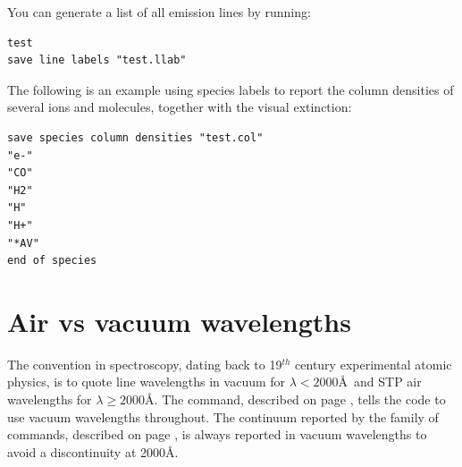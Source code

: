 You can generate a list of all emission lines by running:
\begin{verbatim}
test
save line labels "test.llab"
\end{verbatim}

The following is an example using species labels to report the column densities 
of several ions and molecules, together with the visual extinction:
\begin{verbatim}
save species column densities "test.col"
"e-"
"CO"
"H2"
"H"
"H+"
"*AV"
end of species
\end{verbatim}

\section{Air vs vacuum wavelengths}
\label{sec:AirVsVacuumWavelengths}
The convention in spectroscopy, dating back to 19$^{th}$ century experimental atomic physics,
is to quote line wavelengths in vacuum for  $\lambda < 2000$\AA\ and STP air wavelengths
for $\lambda \ge 2000$\AA.
The  command, 
described on page \pageref{sec:CommandPrintVacuum},
tells the code to use vacuum wavelengths throughout.
The continuum reported by the family of  commands,
described on page \pageref{sec:CommandSaveContinuum},
is always reported in vacuum wavelengths to avoid 
a discontinuity at 2000\AA.


